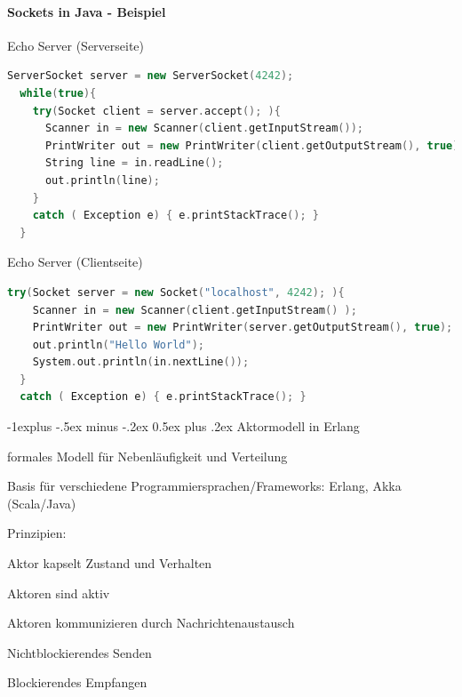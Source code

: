 \documentclass[10pt]{article}
\makeatletter
\renewcommand{\subsection}{\@startsection{subsection}{2}{0mm}%
                                {-1explus -.5ex minus -.2ex}%
                                {0.5ex plus .2ex}%
                                {\normalfont\normalsize\bfseries}}
\makeatother
\begin{document}
  \paragraph{Sockets in Java - Beispiel}
  
  Echo Server (Serverseite)
  \begin{lstlisting}[language=C++]
  ServerSocket server = new ServerSocket(4242);
  while(true){
    try(Socket client = server.accept(); ){
      Scanner in = new Scanner(client.getInputStream());
      PrintWriter out = new PrintWriter(client.getOutputStream(), true);
      String line = in.readLine();
      out.println(line);
    }
    catch ( Exception e) { e.printStackTrace(); }
  }
\end{lstlisting}
  
  Echo Server (Clientseite)
  \begin{lstlisting}[language=C++]
  try(Socket server = new Socket("localhost", 4242); ){
    Scanner in = new Scanner(client.getInputStream() );
    PrintWriter out = new PrintWriter(server.getOutputStream(), true);
    out.println("Hello World");
    System.out.println(in.nextLine());
  }
  catch ( Exception e) { e.printStackTrace(); }
\end{lstlisting}
  
  \subsection{Aktormodell in Erlang}
  \begin{itemize*}
    \item formales Modell für Nebenläufigkeit und Verteilung
    \item Basis für verschiedene Programmiersprachen/Frameworks: Erlang, Akka (Scala/Java)
    \item Prinzipien:
    \begin{itemize*}
      \item Aktor kapselt Zustand und Verhalten
      \item Aktoren sind aktiv
      \item Aktoren kommunizieren durch Nachrichtenaustausch
      \begin{itemize*}
        \item Nichtblockierendes Senden
        \item Blockierendes Empfangen
      \end{itemize*}
    \end{itemize*}
  \end{itemize*}
  
\end{document}
